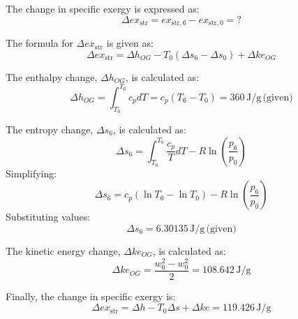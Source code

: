 The change in specific exergy is expressed as:  
\[
\Delta ex_{\text{str}} = ex_{\text{str},6} - ex_{\text{str},0} = ?
\]  

The formula for \(\Delta ex_{\text{str}}\) is given as:  
\[
\Delta ex_{\text{str}} = \Delta h_{OG} - T_0 (\Delta s_{6} - \Delta s_{0}) + \Delta ke_{OG}
\]  

The enthalpy change, \(\Delta h_{OG}\), is calculated as:  
\[
\Delta h_{OG} = \int_{T_0}^{T_6} c_p dT = c_p (T_6 - T_0) = 360 \, \text{J/g} \, \text{(given)}
\]  

The entropy change, \(\Delta s_{6}\), is calculated as:  
\[
\Delta s_{6} = \int_{T_0}^{T_6} \frac{c_p}{T} dT - R \ln \left( \frac{p_6}{p_0} \right)
\]  
Simplifying:  
\[
\Delta s_{6} = c_p (\ln T_6 - \ln T_0) - R \ln \left( \frac{p_6}{p_0} \right)
\]  
Substituting values:  
\[
\Delta s_{6} = 6.30135 \, \text{J/g} \, \text{(given)}
\]  

The kinetic energy change, \(\Delta ke_{OG}\), is calculated as:  
\[
\Delta ke_{OG} = \frac{w_6^2 - w_0^2}{2} = 108.642 \, \text{J/g}
\]  

Finally, the change in specific exergy is:  
\[
\Delta ex_{\text{str}} = \Delta h - T_0 \Delta s + \Delta ke = 119.426 \, \text{J/g}
\]